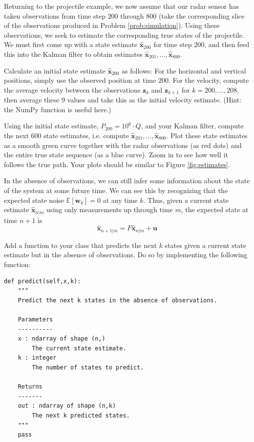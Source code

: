 Returning to the projectile example, we now assume that our radar sensor has taken observations from time step $200$ through $800$ (take the corresponding slice of the
observations produced in Problem \ref{prob:simulation}).
Using these observations, we seek to estimate the corresponding true states of the projectile.
We must first come up with a state estimate $\widehat{\mathbf{x}}_{200}$ for time step $200$, and then feed this into the Kalman filter
to obtain estimates $\widehat{\mathbf{x}}_{201}, \ldots, \widehat{\mathbf{x}}_{800}$.
\begin{problem}
Calculate an initial state estimate $\widehat{\mathbf{x}}_{200}$ as follows:
For the horizontal and vertical positions, simply use the observed position at time $200$. 
For the velocity, compute the average velocity between the observations $\mathbf{z}_k$ and $\mathbf{z}_{k+1}$ for 
$k = 200,\ldots,208$, then average these 9 values and take this as the initial velocity estimate.
(Hint: the NumPy function  is useful here.)

Using the initial state estimate, $P_{200} = 10^{6} \cdot Q$, and your Kalman filter, compute the next $600$ state estimates,
i.e. compute $\widehat{\mathbf{x}}_{201}, \ldots, \widehat{\mathbf{x}}_{800}$.
Plot these state estimates as a smooth green curve together with the radar observations (as red dots) and the entire true state sequence (as a blue curve).
Zoom in to see how well it follows the true path. Your plots should be similar to Figure \ref{fig:estimates}.
\label{prob:state_estimate}
\end{problem}

In the absence of observations, we can still infer some information about the state of the system at some future time.
We can see this by recognizing that the expected state noise $\mathbb{E}\left[\mathbf{w}_{k}\right] = 0$ at any time $k$.
Thus, given a current state estimate $\widehat{\mathbf{x}}_{n|m}$ using only measurements up through time $m$, the expected state at time $n+1$ is
\begin{equation*}
\widehat{\mathbf{x}}_{n+1|m} = F \widehat{\mathbf{x}}_{n|m} + \mathbf{u}
\end{equation*}

\begin{problem}
Add a function to your class that predicts the next $k$ states given a current state estimate but in the absence of observations.
Do so by implementing the following function:
\begin{lstlisting}
def predict(self,x,k):
    """
    Predict the next k states in the absence of observations.

    Parameters
    ----------
    x : ndarray of shape (n,)
        The current state estimate.
    k : integer
        The number of states to predict.

    Returns
    -------
    out : ndarray of shape (n,k)
        The next k predicted states.
    """
    pass
\end{lstlisting}
\end{problem}

